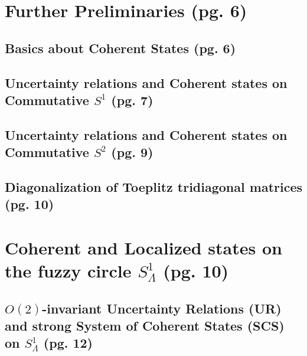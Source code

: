 \documentclass{article}
\begin{document}
\section{Further Preliminaries (pg. 6)}

\subsection{Basics about Coherent States (pg. 6)}

\subsection{Uncertainty relations and Coherent states on Commutative $S^1$ (pg. 7)}

\subsection{Uncertainty relations and Coherent states on Commutative $S^2$ (pg. 9)}

\subsection{Diagonalization of Toeplitz tridiagonal matrices (pg. 10)}

\section{Coherent and Localized states on the fuzzy circle $S^1_{\Lambda}$ (pg. 10)}

\subsection{$O(2)$-invariant Uncertainty Relations (UR) and strong System of Coherent States (SCS) on $S^1_\Lambda$ (pg. 12)}
\end{document}
